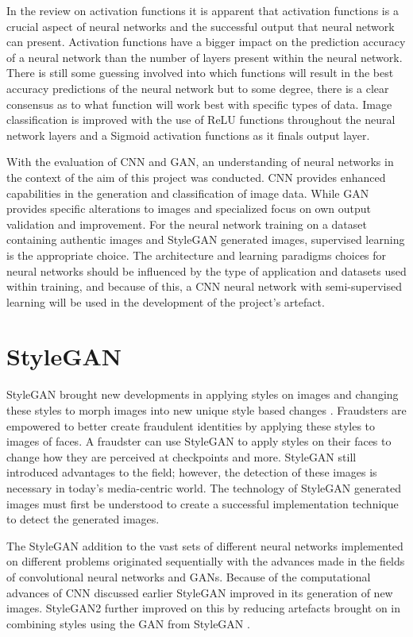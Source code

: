 In the review on activation functions it is apparent that activation functions is a crucial aspect of neural networks and the successful output that neural network can present. Activation functions have a bigger impact on the prediction accuracy of a neural network than the number of layers present within the neural network. There is still some guessing involved into which functions will result in the best accuracy predictions of the neural network but to some degree, there is a clear consensus as to what function will work best with specific types of data. Image classification is improved with the use of ReLU functions throughout the neural network layers and a Sigmoid activation functions as it finals output layer.

With the evaluation of CNN and GAN, an understanding of neural networks in the context of the aim of this project was conducted. CNN provides enhanced capabilities in the generation and classification of image data. While GAN provides specific alterations to images and specialized focus on own output validation and improvement. For the neural network training on a dataset containing authentic images and StyleGAN generated images, supervised learning is the appropriate choice. The architecture and learning paradigms choices for neural networks should be influenced by the type of application and datasets used within training, and because of this, a CNN neural network with semi-supervised learning will be used in the development of the project's artefact.

\section{StyleGAN}

StyleGAN brought new developments in applying styles on images and changing these styles to morph images into new unique style based changes \citep{Karras2019}. Fraudsters are empowered to better create fraudulent identities by applying these styles to images of faces. A fraudster can use StyleGAN to apply styles on their faces to change how they are perceived at checkpoints and more. StyleGAN still introduced advantages to the field; however, the detection of these images is necessary in today's media-centric world. The technology of StyleGAN generated images must first be understood to create a successful implementation technique to detect the generated images.

The StyleGAN addition to the vast sets of different neural networks implemented on different problems originated sequentially with the advances made in the fields of convolutional neural networks and GANs. Because of the computational advances of CNN discussed earlier StyleGAN improved in its generation of new images. StyleGAN2 further improved on this by reducing artefacts brought on in combining styles using the GAN from StyleGAN \citep{Karras2020}.

